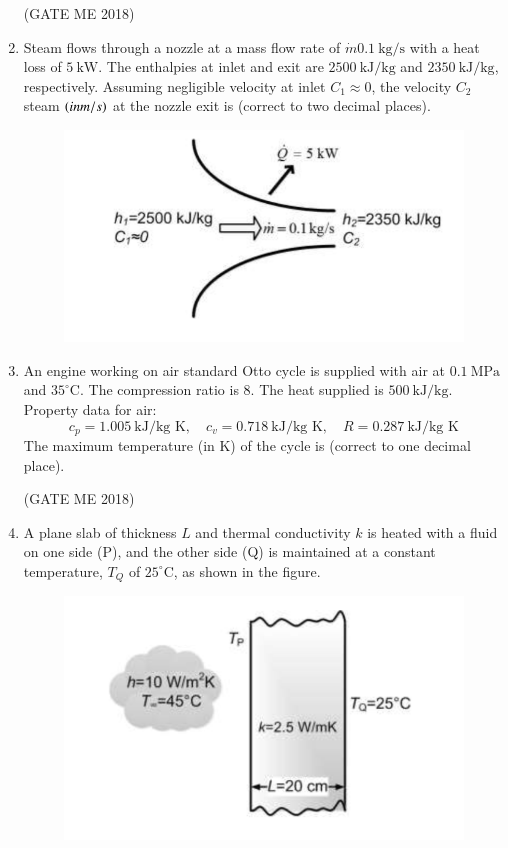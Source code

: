 \documentclass[journal]{IEEEtran}
\numberwithin{equation}{enumi}
\numberwithin{figure}{enumi}
\begin{document}
\begin{enumerate}
  \hfill{(GATE ME 2018)}
  
 \item Steam flows through a nozzle at a mass flow rate of $\dot{m} 0.1~\text{kg/s}$ with a heat loss of $5~\text{kW}$.  The enthalpies at inlet and exit are $2500~\text{kJ/kg}$ and $2350~\text{kJ/kg}$, respectively. Assuming negligible velocity at inlet $C_1 \approx 0$, the velocity $C_2$ steam $\left(in m/s\right)$ at the nozzle exit is  (correct to two decimal places).
  \begin{figure}[H]
\centering
    \includegraphics[width = 0.7\columnwidth]{figs/fig3.15.png}
    \caption*{}
    \label{fig:Q45}
    \end{figure}
\item An engine working on air standard Otto cycle is supplied with air at $0.1~\text{MPa}$ and $35^\circ\text{C}$. The compression ratio is $8$. The heat supplied is $500~\text{kJ/kg}$.  
  Property data for air:  
  \[
  c_p = 1.005~\text{kJ/kg K}, \quad c_v = 0.718~\text{kJ/kg K}, \quad R = 0.287~\text{kJ/kg K}
  \]
  The maximum temperature (in K) of the cycle is \underline{\hspace{3cm}} (correct to one decimal place).

\hfill{(GATE ME 2018)}

  \item A plane slab of thickness $L$ and thermal conductivity $k$ is heated with a fluid on one side (P),  
  and the other side (Q) is maintained at a constant temperature, $T_Q$ of $25^\circ\text{C}$, as shown in the figure.  
  \begin{figure}[H]
\centering
    \includegraphics[width = 0.6\columnwidth]{figs/fig3.16.png}
    \caption*{}
    \label{fig:Q47}
    \end{figure}
  

\end{enumerate}
\end{document}

